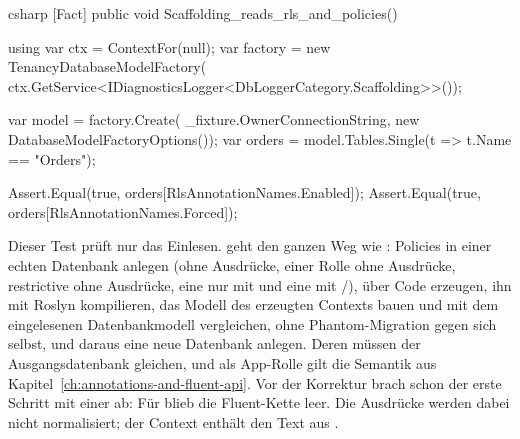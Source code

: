 \begin{sourcecode}{csharp}
[Fact]
public void Scaffolding_reads_rls_and_policies()
{
    using var ctx = ContextFor(null);
    var factory = new TenancyDatabaseModelFactory(
        ctx.GetService<IDiagnosticsLogger<DbLoggerCategory.Scaffolding>>());

    var model = factory.Create(
        _fixture.OwnerConnectionString, new DatabaseModelFactoryOptions());
    var orders = model.Tables.Single(t => t.Name == "Orders");

    Assert.Equal(true, orders[RlsAnnotationNames.Enabled]);
    Assert.Equal(true, orders[RlsAnnotationNames.Forced]);
}
\end{sourcecode}

Dieser Test prüft nur das Einlesen. 
geht den ganzen Weg wie : Policies in einer echten Datenbank
anlegen (ohne Ausdrücke,  einer Rolle ohne Ausdrücke, restrictive ohne
Ausdrücke, eine nur mit  und eine mit /), über
 Code erzeugen, ihn mit Roslyn kompilieren,
das Modell des erzeugten Contexts bauen und mit dem eingelesenen Datenbankmodell vergleichen,
ohne Phantom-Migration gegen sich selbst, und daraus eine neue Datenbank anlegen. Deren
 müssen der Ausgangsdatenbank gleichen, und als App-Rolle gilt die
Semantik aus Kapitel~\ref{ch:annotations-and-fluent-api}. Vor der Korrektur brach schon der
erste Schritt mit einer 
ab: Für  blieb die Fluent-Kette leer. Die Ausdrücke werden
dabei nicht normalisiert; der Context enthält den Text aus .
